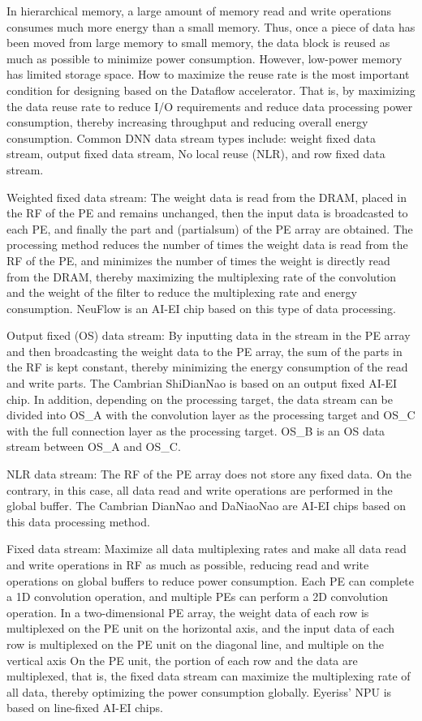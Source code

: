\documentclass[UTF8,12pt,a4paper]{article}
\begin{document}
In hierarchical memory, a large amount of memory read and write operations
consumes much more energy than a small memory.
Thus, once a piece of data has been moved from large memory to small memory,
the data block is reused as much as possible to minimize power consumption.
However, low-power memory has limited storage space.
How to maximize the reuse rate is the most important condition
for designing based on the Dataflow accelerator.
That is, by maximizing the data reuse rate to reduce I/O requirements
and reduce data processing power consumption,
thereby increasing throughput and reducing overall energy consumption.
Common DNN data stream types include: weight fixed data stream, output fixed data stream, No local reuse (NLR), and row fixed data stream.

Weighted fixed data stream: The weight data is read from the DRAM,
placed in the RF of the PE and remains unchanged,
then the input data is broadcasted to each PE,
and finally the part and (partialsum) of the PE array are obtained.
The processing method reduces the number of times the weight data is read from the RF of the PE,
and minimizes the number of times the weight is directly read from the DRAM,
thereby maximizing the multiplexing rate of the convolution
and the weight of the filter to reduce the multiplexing rate and energy consumption.
NeuFlow is an AI-EI chip based on this type of data processing.

Output fixed (OS) data stream: By inputting data in the stream in the PE array
and then broadcasting the weight data to the PE array,
the sum of the parts in the RF is kept constant,
thereby minimizing the energy consumption of the read and write parts.
The Cambrian ShiDianNao is based on an output fixed AI-EI chip.
In addition, depending on the processing target,
the data stream can be divided into OS\_A with the convolution layer as the processing target
and OS\_C with the full connection layer as the processing target.
OS\_B is an OS data stream between OS\_A and OS\_C.

NLR data stream: The RF of the PE array does not store any fixed data.
On the contrary, in this case, all data read and write operations are performed in the global buffer.
The Cambrian DianNao and DaNiaoNao are AI-EI chips based on this data processing method.

Fixed data stream: Maximize all data multiplexing rates and make all data read and write operations in RF as much as possible,
reducing read and write operations on global buffers to reduce power consumption.
Each PE can complete a 1D convolution operation,
and multiple PEs can perform a 2D convolution operation.
In a two-dimensional PE array, the weight data of each row is multiplexed on the PE unit on the horizontal axis,
and the input data of each row is multiplexed on the PE unit on the diagonal line,
and multiple on the vertical axis On the PE unit,
the portion of each row and the data are multiplexed, that is,
the fixed data stream can maximize the multiplexing rate of all data,
thereby optimizing the power consumption globally.
Eyeriss' NPU is based on line-fixed AI-EI chips.
\end{document}
